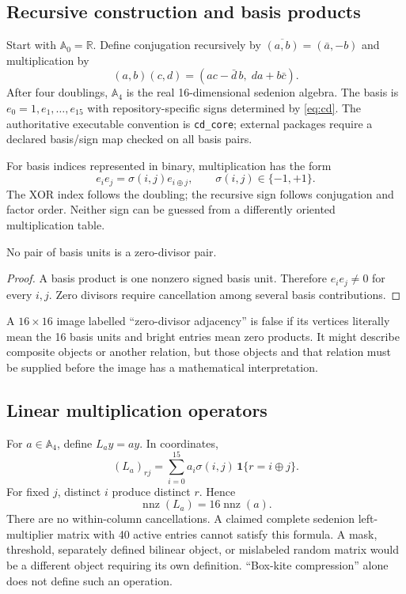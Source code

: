 \documentclass[11pt,a4paper]{article}
\begin{document}
\subsection{Recursive construction and basis products}
Start with $\mathbb A_0=\mathbb R$. Define conjugation recursively by $\overline{(a,b)}=(\bar a,-b)$ and multiplication by
\begin{equation}\label{eq:cd}
(a,b)(c,d)=(ac-\bar d\,b,\;da+b\bar c).
\end{equation}
After four doublings, $\mathbb A_4$ is the real 16-dimensional sedenion algebra. The basis is $e_0=1,e_1,\ldots,e_{15}$ with repository-specific signs determined by \eqref{eq:cd}. The authoritative executable convention is \texttt{cd\_core}; external packages require a declared basis/sign map checked on all basis pairs.

For basis indices represented in binary, multiplication has the form
\begin{equation}
e_i e_j=\sigma(i,j)e_{i\oplus j},\qquad \sigma(i,j)\in\{-1,+1\}.
\end{equation}
The XOR index follows the doubling; the recursive sign follows conjugation and factor order. Neither sign can be guessed from a differently oriented multiplication table.

\begin{corollary}
No pair of basis units is a zero-divisor pair.
\end{corollary}
\begin{proof}
A basis product is one nonzero signed basis unit. Therefore $e_ie_j\ne0$ for every $i,j$. Zero divisors require cancellation among several basis contributions.
\end{proof}
A $16\times16$ image labelled ``zero-divisor adjacency'' is false if its vertices literally mean the 16 basis units and bright entries mean zero products. It might describe composite objects or another relation, but those objects and that relation must be supplied before the image has a mathematical interpretation.

\subsection{Linear multiplication operators}
For $a\in\mathbb A_4$, define $L_a y=ay$. In coordinates,
\begin{equation}
(L_a)_{rj}=\sum_{i=0}^{15}a_i\sigma(i,j)\,\mathbf1\{r=i\oplus j\}.
\end{equation}
For fixed $j$, distinct $i$ produce distinct $r$. Hence
\begin{equation}\label{eq:sparsity}
\operatorname{nnz}(L_a)=16\operatorname{nnz}(a).
\end{equation}
There are no within-column cancellations. A claimed complete sedenion left-multiplier matrix with 40 active entries cannot satisfy this formula. A mask, threshold, separately defined bilinear object, or mislabeled random matrix would be a different object requiring its own definition. ``Box-kite compression'' alone does not define such an operation.
\end{document}
